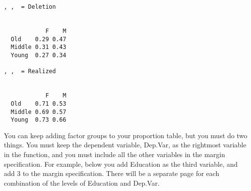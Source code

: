 \documentclass[
  12pt,
  letterpaper]{article}
\newenvironment{Shaded}{\begin{snugshade}}{\end{snugshade}}
\newcommand{\AttributeTok}[1]{\textcolor[rgb]{0.40,0.45,0.13}{#1}}
\newcommand{\CommentTok}[1]{\textcolor[rgb]{0.37,0.37,0.37}{#1}}
\newcommand{\DecValTok}[1]{\textcolor[rgb]{0.68,0.00,0.00}{#1}}
\newcommand{\FunctionTok}[1]{\textcolor[rgb]{0.28,0.35,0.67}{#1}}
\newcommand{\NormalTok}[1]{\textcolor[rgb]{0.00,0.23,0.31}{#1}}
\newcommand{\SpecialCharTok}[1]{\textcolor[rgb]{0.37,0.37,0.37}{#1}}
\renewcommand\texttt[1]{{\ttfamily\color{BrickRed}#1}}
\begin{document}
\begin{Shaded}
\end{Shaded}

\begin{verbatim}
, ,  = Deletion

        
            F    M
  Old    0.29 0.47
  Middle 0.31 0.43
  Young  0.27 0.34

, ,  = Realized

        
            F    M
  Old    0.71 0.53
  Middle 0.69 0.57
  Young  0.73 0.66
\end{verbatim}

You can keep adding factor groups to your proportion table, but you must
do two things. You must keep the dependent variable, \texttt{Dep.Var},
as the rightmost variable in the function, and you must include all the
other variables in the margin specification. For example, below you add
\texttt{Education} as the third variable, and add 3 to the margin
specification. There will be a separate page for each combination of the
levels of \texttt{Education} and \texttt{Dep.Var}.

\begin{Shaded}
\end{Shaded}
\end{document}
